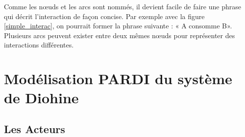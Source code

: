   Comme les nœuds et les arcs sont nommés, il devient facile de faire une phrase qui décrit l'interaction de façon concise. Par exemple avec la figure \ref{simple_interac}, on pourrait former la phrase suivante : « A consomme B». Plusieurs arcs peuvent exister entre deux mêmes nœuds pour représenter des interactions différentes.

\section{Modélisation PARDI du système de Diohine}

\subsection{Les Acteurs}

